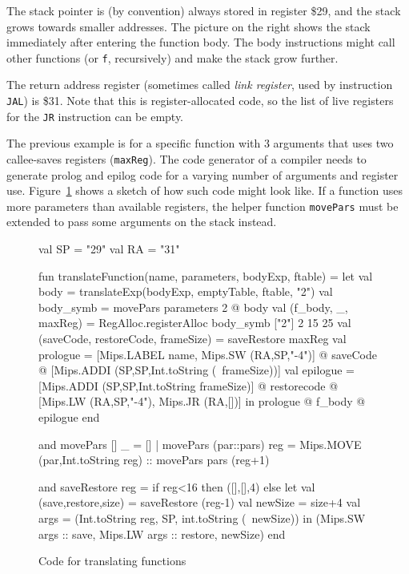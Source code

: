 \documentclass[11pt,a4paper]{article}
\newcommand{\codesize}{\scriptsize}
\newcommand{\cd}[1]{{{\codesize\tt #1}}}
\begin{document}
The stack pointer is (by convention) always stored in register \$29,
and the stack grows towards smaller addresses. The picture on the right shows the
stack immediately after entering the function body. The body instructions might
call other functions (or \cd{f}, recursively) and make the stack grow 
further.

The return address register (sometimes called \emph{link register}, used
by instruction \cd{JAL}) is \$31.
Note that this is register-allocated code, so the list of live registers 
for the \cd{JR} instruction can be empty.

The previous example is for a specific function with 3 arguments that uses
two callee-saves registers ({\tt maxReg}). The code generator of a compiler needs 
to generate prolog and epilog code for a varying number of arguments and register use.
%
Figure~\ref{translateFunction} shows a sketch of how such code might look
like. If a function uses more parameters than available registers,
the helper function {\tt movePars} must be extended to pass some arguments
on the stack instead.

\begin{figure}[tbh]
\begin{code}[frame=lines,label=\textrm{translating a function}]
val SP = "29"
val RA = "31"

fun translateFunction(name, parameters, bodyExp, ftable) =
  let val body = translateExp(bodyExp, emptyTable, ftable, "2")
      val body_symb = movePars parameters 2 @ body
      val (f_body, _, maxReg) =
            RegAlloc.registerAlloc body_symb ["2"] 2 15 25
      val (saveCode, restoreCode, frameSize) = saveRestore maxReg
      val prologue = [Mips.LABEL name, Mips.SW (RA,SP,"-4")]
                     @ saveCode @
                     [Mips.ADDI (SP,SP,Int.toString (~frameSize))]
      val epilogue = [Mips.ADDI (SP,SP,Int.toString frameSize)]
                     @ restorecode @
                     [Mips.LW (RA,SP,"-4"), Mips.JR (RA,[])]
  in prologue @ f_body @ epilogue
  end

and movePars [] _ = []
  | movePars (par::pars) reg =
      Mips.MOVE (par,Int.toString reg) :: movePars pars (reg+1)

and saveRestore reg =
  if reg<16 then ([],[],4)
  else let val (save,restore,size) = saveRestore (reg-1)
           val newSize = size+4
           val args = (Int.toString reg, SP, int.toString (~newSize))
       in (Mips.SW args :: save, Mips.LW args :: restore, newSize)
       end
\end{code}
\vspace*{-2em}
\caption{Code for translating functions}
\label{translateFunction}
\end{figure}
\end{document}
